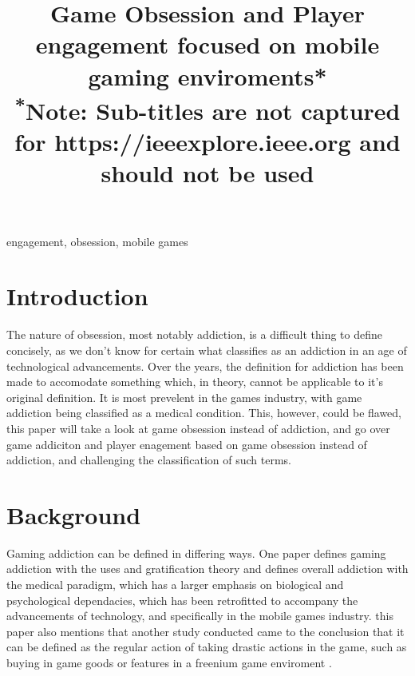 \documentclass[conference]{IEEEtran}
\begin{document}
\title{Game Obsession and Player engagement focused on mobile gaming enviroments*\\
{\footnotesize \textsuperscript{*}Note: Sub-titles are not captured for https://ieeexplore.ieee.org  and
should not be used}
}

\author{
}

\maketitle



\begin{abstract}

\end{abstract}

\begin{IEEEkeywords}
engagement, obsession, mobile games
\end{IEEEkeywords}

\section{Introduction}
The nature of obsession, most notably addiction, is a difficult thing to define concisely, as we don't know for certain what classifies as an addiction in an age of technological advancements. Over the years, the definition for addiction has been made to accomodate something which, in theory, cannot be applicable to it's original definition. It is most prevelent in the games industry, with game addiction being classified as a medical condition. This, however, could be flawed, this paper will take a look at game obsession instead of addiction, and go over game addiciton and player enagement based on game obsession instead of addiction, and challenging the classification of such terms.\\
\section{Background}
Gaming addiction can be defined in differing ways. One paper \cite{yasir2021} defines gaming addiction with the uses and gratification theory and defines overall addiction with the medical paradigm, which has a larger emphasis on biological and psychological dependacies, which has been retrofitted to accompany the advancements of technology, and specifically in the mobile games industry. this paper also mentions that another study conducted came to the conclusion that it can be defined as the regular action of taking drastic actions in the game, such as buying in game goods or features in a freenium game enviroment \cite{XWang2021}. \\
\end{document}
